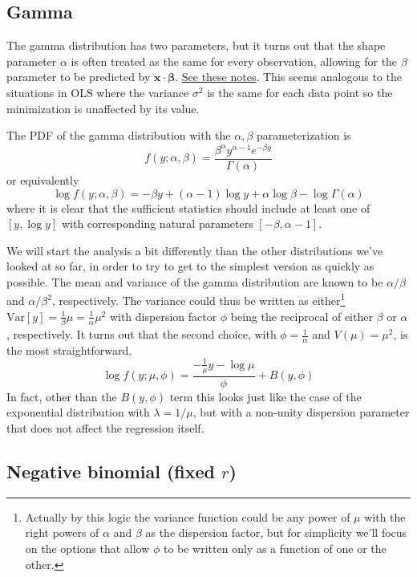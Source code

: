 \documentclass{article}
\newcommand{\bbeta}{\boldsymbol{\beta}}
\begin{document}
\subsection{Gamma}
The gamma distribution has two parameters, but it turns out that the shape
parameter \(\alpha\) is often treated as the same for every observation, allowing
for the \(\beta\) parameter to be predicted by
\(\mathbf{x}\cdot\bbeta\).
\href{https://civil.colorado.edu/~balajir/CVEN6833/lectures/GammaGLM-01.pdf}{See these notes}.
This seems analogous to the situations in OLS where the variance \(\sigma^2\)
is the same for each data point so the minimization is unaffected by its value.

The PDF of the gamma distribution with the \(\alpha, \beta\) parameterization
is
\[ f(y; \alpha, \beta) = \frac{\beta^\alpha y^{\alpha-1} e^{-\beta y}}{\Gamma(\alpha)} \]
or equivalently
\[
\log f(y; \alpha, \beta) = -\beta y + (\alpha-1) \log y + \alpha \log \beta -
\log \Gamma(\alpha)
\]
where it is clear that the sufficient statistics should include at least one of
\([y, \log y]\) with corresponding natural parameters \([-\beta,
\alpha-1]\).

We will start the analysis a bit differently than the other distributions we've
looked at so far, in order to try to get to the simplest version as quickly as
possible.
The mean and variance of the gamma distribution are known to be
\(\alpha/\beta\) and \(\alpha/\beta^2\), respectively.
The variance could thus be written as either\footnote{
  Actually by this logic the variance function could be any power of \(\mu\)
  with the right powers of \(\alpha\) and \(\beta\) as the dispersion
  factor, but for simplicity we'll focus on the options that allow \(\phi\)
  to be written only as a function of one or the other.
} \(\textrm{Var}[y] =
\frac{1}{\beta}\mu = \frac{1}{\alpha}\mu^2\) with dispersion factor \(\phi\)
being the reciprocal of either \(\beta\) or \(\alpha\), respectively.
It turns out that the second choice, with \(\phi = \frac{1}{\alpha}\) and
\(V(\mu) = \mu^2\), is the most straightforward.
\[ \log f(y; \mu, \phi) = \frac{-\frac{1}{\mu} y - \log \mu}{\phi} + B(y, \phi)
\]
In fact, other than the \(B(y, \phi)\) term this looks just like the case of
the exponential distribution with \(\lambda = 1/\mu\), but with a non-unity
dispersion parameter that does not affect the regression itself.

\subsection{Negative binomial (fixed \(r\))}
\end{document}
